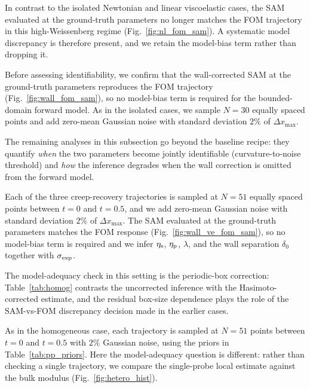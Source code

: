 In contrast to the isolated Newtonian and linear viscoelastic cases, the SAM
evaluated at the ground-truth parameters no longer matches the FOM trajectory in
this high-Weissenberg regime (Fig.~\ref{fig:nl_fom_sam}). A systematic model
discrepancy is therefore present, and we retain the model-bias term rather than
dropping it.


Before assessing identifiability, we confirm that the wall-corrected SAM at the
ground-truth parameters reproduces the FOM trajectory (Fig.~\ref{fig:wall_fom_sam}),
so no model-bias term is required for the bounded-domain forward model. As in the
isolated cases, we sample $N=30$ equally spaced points and add zero-mean Gaussian
noise with standard deviation $2\%$ of $\Delta x_{\max}$.

The remaining analyses in this subsection go beyond the baseline recipe: they
quantify \emph{when} the two parameters become jointly identifiable
(curvature-to-noise threshold) and \emph{how} the inference degrades when the
wall correction is omitted from the forward model.


Each of the three creep-recovery trajectories is sampled at $N=51$ equally spaced
points between $t=0$ and $t=0.5$, and we add zero-mean Gaussian noise with standard
deviation $2\%$ of $\Delta x_{\max}$. The SAM evaluated at the ground-truth
parameters matches the FOM response (Fig.~\ref{fig:wall_ve_fom_sam}), so no
model-bias term is required and we infer $\eta_{\rm s}$, $\eta_{\rm p}$, $\lambda$,
and the wall separation $\delta_0$ together with $\sigma_{\rm exp}$.


The model-adequacy check in this setting is the periodic-box correction:
Table~\ref{tab:homog} contrasts the uncorrected inference with the
Hasimoto-corrected estimate, and the residual box-size dependence plays the role
of the SAM-vs-FOM discrepancy decision made in the earlier cases.


As in the homogeneous case, each trajectory is sampled at $N=51$ points between
$t=0$ and $t=0.5$ with $2\%$ Gaussian noise, using the priors in
Table~\ref{tab:pp_priors}. Here the model-adequacy question is different: rather
than checking a single trajectory, we compare the single-probe local estimate
against the bulk modulus (Fig.~\ref{fig:hetero_hist}).

